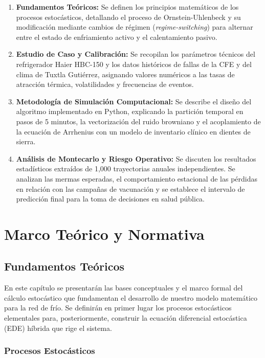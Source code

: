 \documentclass[
  spanish,
  letterpaper,
  DIV=11,
  numbers=noendperiod]{scrreprt}
\providecommand{\tightlist}{%
  \setlength{\itemsep}{0pt}\setlength{\parskip}{0pt}}
\theoremstyle{plain}
\theoremstyle{definition}
\theoremstyle{remark}
\begin{document}
\begin{enumerate}
\def\labelenumi{\arabic{enumi}.}
\tightlist
\item
  \textbf{Fundamentos Teóricos:} Se definen los principios matemáticos
  de los procesos estocásticos, detallando el proceso de
  Ornstein-Uhlenbeck y su modificación mediante cambios de régimen
  (\emph{regime-switching}) para alternar entre el estado de
  enfriamiento activo y el calentamiento pasivo.
\item
  \textbf{Estudio de Caso y Calibración:} Se recopilan los parámetros
  técnicos del refrigerador Haier HBC-150 y los datos históricos de
  fallas de la CFE y del clima de Tuxtla Gutiérrez, asignando valores
  numéricos a las tasas de atracción térmica, volatilidades y
  frecuencias de eventos.
\item
  \textbf{Metodología de Simulación Computacional:} Se describe el
  diseño del algoritmo implementado en Python, explicando la partición
  temporal en pasos de 5 minutos, la vectorización del ruido browniano y
  el acoplamiento de la ecuación de Arrhenius con un modelo de
  inventario clínico en dientes de sierra.
\item
  \textbf{Análisis de Montecarlo y Riesgo Operativo:} Se discuten los
  resultados estadísticos extraídos de 1,000 trayectorias anuales
  independientes. Se analizan las mermas esperadas, el comportamiento
  estacional de las pérdidas en relación con las campañas de vacunación
  y se establece el intervalo de predicción final para la toma de
  decisiones en salud pública.
\end{enumerate}

\part{Marco Teórico y Normativa}

\chapter{Fundamentos Teóricos}\label{fundamentos-teuxf3ricos}

En este capítulo se presentarán las bases conceptuales y el marco formal
del cálculo estocástico que fundamentan el desarrollo de nuestro modelo
matemático para la red de frío. Se definirán en primer lugar los
procesos estocásticos elementales para, posteriormente, construir la
ecuación diferencial estocástica (EDE) híbrida que rige el sistema.

\section{Procesos Estocásticos}\label{procesos-estocuxe1sticos}
\end{document}
